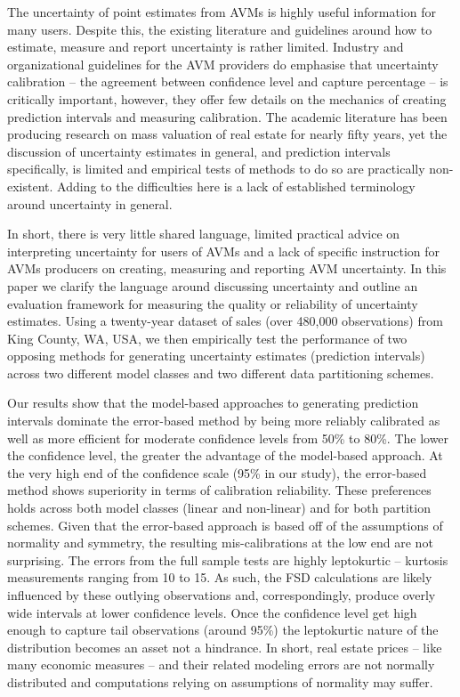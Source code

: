 \documentclass[colTwo]{anon}
\theoremstyle{definition}
\begin{document}
The uncertainty of point estimates from AVMs is highly useful information for many users. Despite this, the existing literature and guidelines around how to estimate, measure and report uncertainty is rather limited.  Industry and organizational guidelines for the AVM providers do emphasise that uncertainty calibration -- the agreement between confidence level and capture percentage -- is critically important, however, they offer few details on the mechanics of creating prediction intervals and measuring calibration. The academic literature has been producing research on mass valuation of real estate for nearly fifty years, yet the discussion of uncertainty estimates in general, and prediction intervals specifically, is limited and empirical tests of methods to do so are practically non-existent.  Adding to the difficulties here is a lack of established terminology around uncertainty in general.  

In short, there is very little shared language, limited practical advice on interpreting uncertainty for users of AVMs  and a lack of specific instruction for AVMs producers on creating, measuring and reporting AVM uncertainty. In this paper we clarify the language around discussing uncertainty and outline an evaluation framework for measuring the quality or reliability of uncertainty estimates.  Using a twenty-year dataset of sales (over 480,000 observations) from King County, WA, USA, we then empirically test the performance of two opposing methods for generating uncertainty estimates (prediction intervals) across two different model classes and two different data partitioning schemes.

Our results show that the model-based approaches to generating prediction intervals dominate the error-based method by being more reliably calibrated as well as more efficient for moderate confidence levels from 50\% to 80\%.  The lower the confidence level, the greater the advantage of the model-based approach. At the very high end of the confidence scale (95\% in our study), the error-based method shows superiority in terms of calibration reliability. These preferences holds across both model classes (linear and non-linear) and for both partition schemes.  Given that the error-based approach is based off of the assumptions of normality and symmetry, the resulting mis-calibrations at the low end are not surprising.  The errors from the full sample tests are highly leptokurtic -- kurtosis measurements ranging from 10 to 15. As such, the FSD calculations are likely influenced by these outlying observations and, correspondingly, produce overly wide intervals at lower confidence levels. Once the confidence level get high enough to capture tail observations (around 95\%) the leptokurtic nature of the distribution becomes an asset not a hindrance.  In short, real estate prices -- like many economic measures -- and their related modeling errors are not normally distributed and computations relying on assumptions of normality may suffer. 
\end{document}
